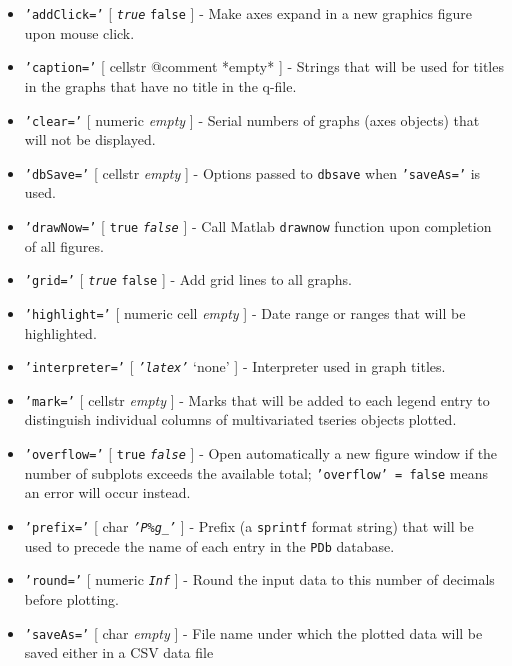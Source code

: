 \begin{itemize}
\item
  \texttt{'addClick='} {[} \emph{\texttt{true}} \textbar{}
  \texttt{false} {]} - Make axes expand in a new graphics figure upon
  mouse click.
\item
  \texttt{'caption='} {[} cellstr \textbar{} @comment \textbar{} *empty*
  {]} - Strings that will be used for titles in the graphs that have no
  title in the q-file.
\item
  \texttt{'clear='} {[} numeric \textbar{} \emph{empty} {]} - Serial
  numbers of graphs (axes objects) that will not be displayed.
\item
  \texttt{'dbSave='} {[} cellstr \textbar{} \emph{empty} {]} - Options
  passed to \texttt{dbsave} when \texttt{'saveAs='} is used.
\item
  \texttt{'drawNow='} {[} \texttt{true} \textbar{} \emph{\texttt{false}}
  {]} - Call Matlab \texttt{drawnow} function upon completion of all
  figures.
\item
  \texttt{'grid='} {[} \emph{\texttt{true}} \textbar{} \texttt{false}
  {]} - Add grid lines to all graphs.
\item
  \texttt{'highlight='} {[} numeric \textbar{} cell \textbar{}
  \emph{empty} {]} - Date range or ranges that will be highlighted.
\item
  \texttt{'interpreter='} {[} \emph{\texttt{'latex'}} \textbar{} `none'
  {]} - Interpreter used in graph titles.
\item
  \texttt{'mark='} {[} cellstr \textbar{} \emph{empty} {]} - Marks that
  will be added to each legend entry to distinguish individual columns
  of multivariated tseries objects plotted.
\item
  \texttt{'overflow='} {[} \texttt{true} \textbar{}
  \emph{\texttt{false}} {]} - Open automatically a new figure window if
  the number of subplots exceeds the available total;
  \texttt{'overflow' = false} means an error will occur instead.
\item
  \texttt{'prefix='} {[} char \textbar{} \emph{\texttt{'P\%g\_'}} {]} -
  Prefix (a \texttt{sprintf} format string) that will be used to precede
  the name of each entry in the \texttt{PDb} database.
\item
  \texttt{'round='} {[} numeric \textbar{} \emph{\texttt{Inf}} {]} -
  Round the input data to this number of decimals before plotting.
\item
  \texttt{'saveAs='} {[} char \textbar{} \emph{empty} {]} - File name
  under which the plotted data will be saved either in a CSV data file

\end{itemize}
